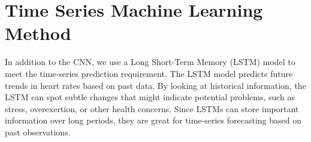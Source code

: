 \documentclass[10pt]{extarticle}
\begin{document}
\section{Time Series Machine Learning Method}

In addition to the CNN, we use a Long Short-Term Memory (LSTM) model to meet the time-series prediction requirement. The LSTM model predicts future trends in heart rates based on past data. By looking at historical information, the LSTM can spot subtle changes that might indicate potential problems, such as stress, overexertion, or other health concerns. Since LSTMs can store important information over long periods, they are great for time-series forecasting based on past observations.

\newpage
\end{document}
